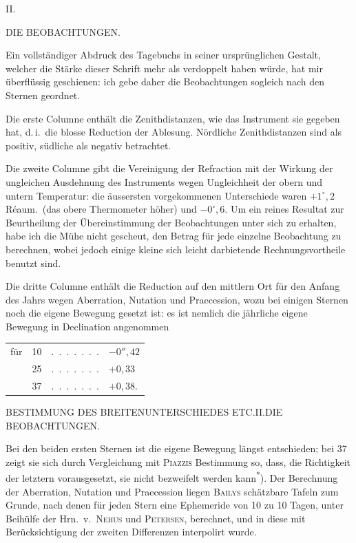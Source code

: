 \clearpage
\vspace*{18mm}
\begin{center}
{\large II.}\par\medskip
{\Large DIE BEOBACHTUNGEN.}
\end{center}

Ein vollständiger Abdruck des Tagebuchs in seiner ursprünglichen Gestalt,
welcher die Stärke dieser Schrift mehr als verdoppelt haben würde, hat
mir überflüssig geschienen: ich gebe daher die Beobachtungen sogleich nach
den Sternen geordnet.

Die erste Columne enthält die Zenithdistanzen, wie das Instrument sie
gegeben hat, d.\,i.\ die blosse Reduction der Ablesung. Nördliche Zenithdistanzen
sind als positiv, südliche als negativ betrachtet.

Die zweite Columne gibt die Vereinigung der Refraction mit der Wirkung
der ungleichen Ausdehnung des Instruments wegen Ungleichheit der
obern und untern Temperatur: die äussersten vorgekommenen Unterschiede
waren $+1^\circ{,}2$ Réaum.\ (das obere Thermometer höher) und $-0^\circ{,}6$. Um ein
reines Resultat zur Beurtheilung der Übereinstimmung der Beobachtungen
unter sich zu erhalten, habe ich die Mühe nicht gescheut, den Betrag für
jede einzelne Beobachtung zu berechnen, wobei jedoch einige kleine sich
leicht darbietende Rechnungsvortheile benutzt sind.

Die dritte Columne enthält die Reduction auf den mittlern Ort für den
Anfang des Jahrs wegen Aberration, Nutation und Praecession, wozu bei
einigen Sternen noch die eigene Bewegung gesetzt ist: es ist nemlich die jährliche
eigene Bewegung in Declination angenommen
\begin{center}
\begin{tabular}{@{}lr@{\quad}c@{\quad}l@{}}
für&10&.\ .\ .\ .\ .\ .\ .&$-0''{,}42$\\
&25&.\ .\ .\ .\ .\ .\ .&$+0{,}33$\\
&37&.\ .\ .\ .\ .\ .\ .&$+0{,}38$.
\end{tabular}
\end{center}

\clearpage
\noindent\parbox[t]{\dimexpr\textwidth-10mm\relax}{\centering\scriptsize BESTIMMUNG DES BREITENUNTERSCHIEDES ETC.\quad II.\quad DIE BEOBACHTUNGEN.}\par
\noindent Bei den beiden ersten Sternen ist die eigene Bewegung längst entschieden;
bei 37 zeigt sie sich durch Vergleichung mit \textsc{Piazzis} Bestimmung so, dass,
die Richtigkeit der letztern vorausgesetzt, sie nicht bezweifelt werden kann\textsuperscript{*}).
Der Berechnung der Aberration, Nutation und Praecession liegen \textsc{Bailys}
schätzbare Tafeln zum Grunde, nach denen für jeden Stern eine Ephemeride
von 10 zu 10 Tagen, unter Beihülfe der Hrn.\ v.\ \textsc{Nehus} und \textsc{Petersen}, berechnet,
und in diese mit Berücksichtigung der zweiten Differenzen interpolirt
wurde.

